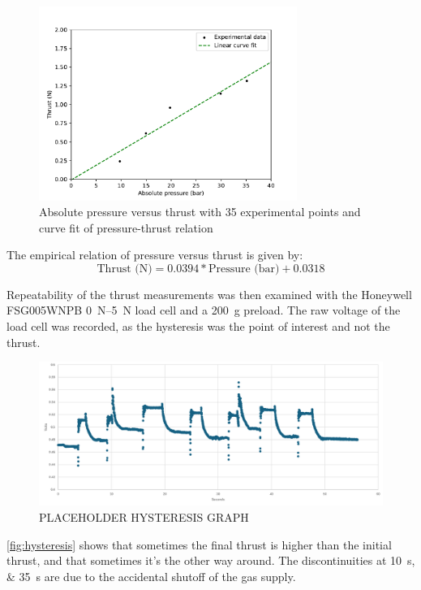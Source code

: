             \begin{figure}[!ht]
                \centering
                \includegraphics[width=0.75\textwidth]{assets/4 experiments/pressure-thrust graph.pdf}
                \caption{Absolute pressure versus thrust with 35 experimental points and curve fit of pressure-thrust relation}
                \label{fig:coldflow pressure-thrust}
            \end{figure}

            The empirical relation of pressure versus thrust is given by:
            \[
            \text{Thrust (N)} = 0.0394*\text{Pressure (bar)} + 0.0318
            \]

            Repeatability of the thrust measurements was then examined with the Honeywell FSG005WNPB \qtyrange{0}{5}{N} load cell and a \qty{200}{g} preload. The raw voltage of the load cell was recorded, as the hysteresis was the point of interest and not the thrust. 
            \begin{figure}[h]
                \centering
                \includegraphics[width=0.8\linewidth]{assets/5 discussion/hysterisis.png}
                \caption{PLACEHOLDER HYSTERESIS GRAPH}
                \label{fig:hysteresis}
            \end{figure}
            \autoref{fig:hysteresis} shows that sometimes the final thrust is higher than the initial thrust, and that sometimes it's the other way around. The discontinuities at \qtylist{10;35}{s} are due to the accidental shutoff of the gas supply.

